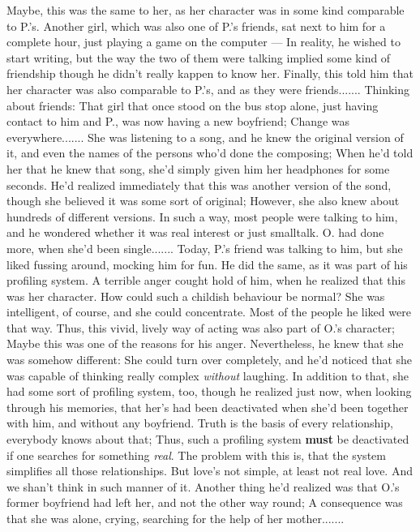 Maybe, this was the same to her, as her character was in some kind comparable to P.'s. 
Another girl, which was also one of P.'s friends, sat next to him for a complete hour, just playing a game on the computer --- In reality, he wished to start writing, but the way the two of them were talking implied some kind of friendship though he didn't really kappen to know her. Finally, this told him that her character was also comparable to P.'s, and as they were friends.......
Thinking about friends: That girl that once stood on the bus stop alone, just having contact to him and P., was now having a new boyfriend; Change was everywhere.......
She was listening to a song, and he knew the original version of it, and even the names of the persons who'd done the composing; When he'd told her that he knew that song, she'd simply given him her headphones for some seconds. He'd realized immediately that this was another version of the sond, though she believed it was some sort of original; However, she also knew about hundreds of different versions. 
In such a way, most people were talking to him, and he wondered whether it was real interest or just smalltalk. O. had done more, when she'd been single.......
Today, P.'s friend was talking to him, but she liked fussing around, mocking him for fun. He did the same, as it was part of his profiling system. 
A terrible anger cought hold of him, when he realized that this was her character. How could such a childish behaviour be normal? She was intelligent, of course, and she could concentrate. 
Most of the people he liked were that way. Thus, this vivid, lively way of acting was also part of O.'s character; Maybe this was one of the reasons for his anger. Nevertheless, he knew that she was somehow different: She could turn over completely, and he'd noticed that she was capable of thinking really complex \emph{without} laughing. In addition to that, she had some sort of profiling system, too, though he realized just now, when looking through his memories, that her's had been deactivated when she'd been together with him, and without any boyfriend. 
Truth is the basis of every relationship, everybody knows about that; Thus, such a profiling system \textbf{must} be deactivated if one searches for something \emph{real}. The problem with this is, that the system simplifies all those relationships. 
But love's not simple, at least not real love. 
And we shan't think in such manner of it. 
Another thing he'd realized was that O.'s former boyfriend had left her, and not the other way round; A consequence was that she was alone, crying, searching for the help of her mother.......
